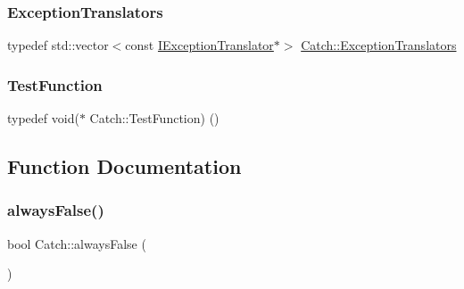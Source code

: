 \hypertarget{namespace_catch_ae0442a3627f91437716106138b5f540b}{}\label{namespace_catch_ae0442a3627f91437716106138b5f540b} 
\subsubsection{\texorpdfstring{Exception\+Translators}{ExceptionTranslators}}
{\footnotesize\ttfamily typedef std\+::vector$<$const \hyperlink{struct_catch_1_1_i_exception_translator}{I\+Exception\+Translator}$\ast$$>$ \hyperlink{namespace_catch_ae0442a3627f91437716106138b5f540b}{Catch\+::\+Exception\+Translators}}

\hypertarget{namespace_catch_a26414f52d0835939fae52aadd27e6257}{}\label{namespace_catch_a26414f52d0835939fae52aadd27e6257} 
\subsubsection{\texorpdfstring{Test\+Function}{TestFunction}}
{\footnotesize\ttfamily typedef void($\ast$ Catch\+::\+Test\+Function) ()}



\subsection{Function Documentation}
\hypertarget{namespace_catch_ad425271249dd02956a9709e78b8b2783}{}\label{namespace_catch_ad425271249dd02956a9709e78b8b2783} 
\subsubsection{\texorpdfstring{always\+False()}{alwaysFalse()}}
{\footnotesize\ttfamily bool Catch\+::always\+False (\begin{DoxyParamCaption}{ }\end{DoxyParamCaption})\hspace{0.3cm}{\ttfamily [inline]}}

